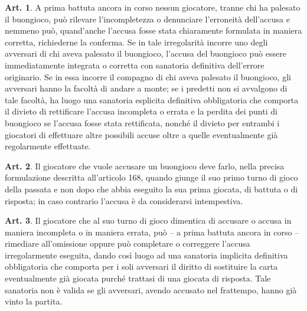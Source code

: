\documentclass[italian,a4paper]{article}
\theoremstyle{definition}
\newtheorem{art}{Art.}
\begin{document}
\begin{art}
A prima battuta ancora in corso nessun giocatore, tranne chi ha palesato il buongioco, può rilevare l'incompletezza o denunciare l'erroneità dell'accusa e nemmeno può, quand'anche l'accusa fosse stata chiaramente formulata in maniera corretta, richiederne la conferma.
Se in tale irregolarità incorre uno degli avversari di chi aveva palesato il buongioco, l'accusa del buongioco può essere immediatamente integrata o corretta con sanatoria definitiva dell'errore originario.
Se in essa incorre il compagno di chi aveva palesato il buongioco, gli avversari hanno la facoltà di andare a monte; se i predetti non si avvalgono di tale facoltà, ha luogo una sanatoria esplicita definitiva obbligatoria che comporta il divieto di rettificare l'accusa incompleta o errata e la perdita dei punti di buongioco se l'accusa fosse stata rettificata, nonché il divieto per entrambi i giocatori di effettuare altre possibili accuse oltre a quelle eventualmente già regolarmente effettuate.
\end{art}
\begin{art}
Il giocatore che vuole accusare un buongioco deve farlo, nella precisa formulazione descritta all'articolo 168, quando giunge il suo primo turno di gioco della passata e non dopo che abbia eseguito la sua prima giocata, di battuta o di risposta; in caso contrario l'accusa è da considerarsi intempestiva.
\end{art}
\begin{art}
Il giocatore che al suo turno di gioco dimentica di accusare o accusa in maniera incompleta o in maniera errata, può – a prima battuta ancora in corso – rimediare all'omissione oppure può completare o correggere l'accusa irregolarmente eseguita, dando così luogo ad una sanatoria implicita definitiva obbligatoria che comporta per i soli avversari il diritto di sostituire la carta eventualmente già giocata purché trattasi di una giocata di risposta. Tale sanatoria non è valida se gli avversari, avendo accusato nel frattempo, hanno già vinto la partita.
\end{art}
\end{document}
